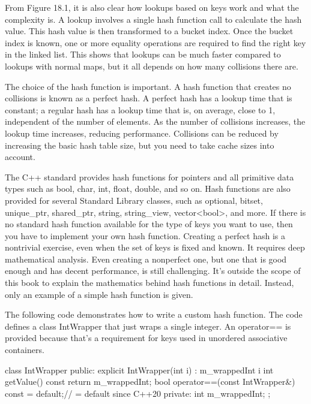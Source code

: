 From Figure 18.1, it is also clear how lookups based on keys work and what the complexity is.
A lookup involves a single hash function call to calculate the hash value. This hash value is then transformed to a bucket index. Once the bucket index is known, one or more equality operations are required to find the right key in the linked list. This shows that lookups can be much faster compared to lookups with normal maps, but it all depends on how many collisions there are.

The choice of the hash function is important. A hash function that creates no collisions is known as a perfect hash. A perfect hash has a lookup time that is constant; a regular hash has a lookup time that is, on average, close to 1, independent of the number of elements. As the number of collisions increases, the lookup time increases, reducing performance. Collisions can be reduced by increasing the basic hash table size, but you need to take cache sizes into account.

The C++ standard provides hash functions for pointers and all primitive data types such as bool, char, int, float, double, and so on. Hash functions are also provided for several Standard Library classes, such as optional, bitset, unique\_ptr, shared\_ptr, string, string\_view, vector<bool>, and more. If there is no standard hash function available for the type of keys you want to use, then you have to implement your own hash function. Creating a perfect hash is a nontrivial exercise, even when the set of keys is fixed and known. It requires deep mathematical analysis. Even creating a nonperfect one, but one that is good enough and has decent performance, is still challenging. It’s outside the scope of this book to explain the mathematics behind hash functions in detail. Instead, only an example of a simple hash function is given.

The following code demonstrates how to write a custom hash function. The code defines a class IntWrapper that just wraps a single integer. An operator== is provided because that’s a requirement for keys used in unordered associative containers.

\begin{cpp}
class IntWrapper
{
    public:
        explicit IntWrapper(int i) : m_wrappedInt { i } {}
        int getValue() const { return m_wrappedInt; }
        bool operator==(const IntWrapper&) const = default;// = default since C++20
    private:
        int m_wrappedInt;
};
\end{cpp}


